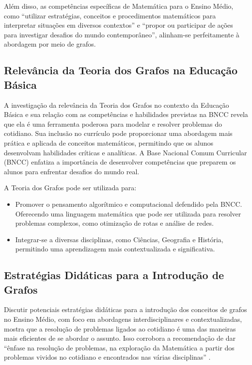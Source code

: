\documentclass[
  12pt,
  oneside,
  a4paper,
  english,
  brazilian
  ]{abntex2}
\theoremstyle{definition}
\begin{document}
Além disso, as competências específicas de Matemática para o Ensino Médio, como
``utilizar estratégias, conceitos e procedimentos matemáticos para interpretar
situações em diversos contextos'' e ``propor ou participar de ações para
investigar desafios do mundo contemporâneo'', alinham-se perfeitamente à
abordagem por meio de grafos.

\subsection{Relevância da Teoria dos Grafos na Educação Básica}

A investigação da relevância da Teoria dos Grafos no contexto da Educação Básica e sua relação com as competências e habilidades previstas na BNCC revela que ela é uma ferramenta poderosa para modelar e resolver problemas do cotidiano. Sua inclusão no currículo pode proporcionar uma abordagem mais prática e aplicada de conceitos matemáticos, permitindo que os alunos desenvolvam habilidades críticas e analíticas. A Base Nacional Comum Curricular (BNCC) \cite{brasil2018} enfatiza a importância de desenvolver competências que preparem os alunos para enfrentar desafios do mundo real.

A Teoria dos Grafos pode ser utilizada para:

\begin{itemize}
    \item Promover o pensamento algorítmico e computacional defendido pela BNCC. Oferecendo uma linguagem matemática que pode ser utilizada para resolver problemas complexos, como otimização de rotas e análise de redes.
    \item Integrar-se a diversas disciplinas, como Ciências, Geografia e História, permitindo uma aprendizagem mais contextualizada e significativa.
\end{itemize}

\subsection{Estratégias Didáticas para a Introdução de Grafos}

Discutir potenciais estratégias didáticas para a introdução dos conceitos de grafos no Ensino Médio, com foco em abordagens interdisciplinares e contextualizadas, mostra que a resolução de problemas ligados ao cotidiano é uma das maneiras mais eficientes de se abordar o assunto. Isso corrobora a recomendação de dar ``ênfase na resolução de problemas, na exploração da Matemática a partir dos problemas vividos no cotidiano e encontrados nas várias disciplinas'' \cite{brasil2002}.
\end{document}
